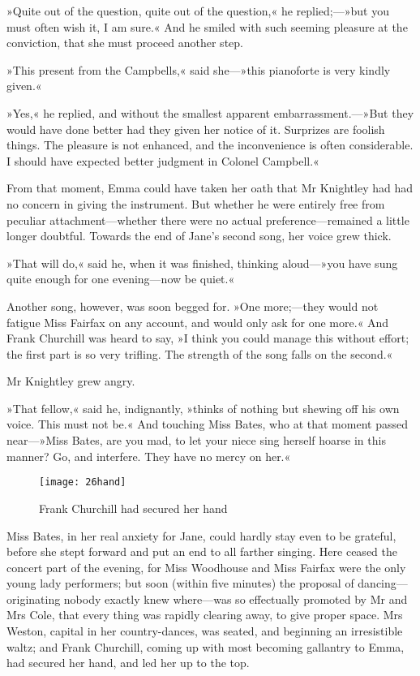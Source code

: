 »Quite out of the question, quite out of the question,« he replied;—»but you must often wish it, I am sure.« And he smiled with such seeming pleasure at the conviction, that she must proceed another step.

»This present from the Campbells,« said she—»this pianoforte is very kindly given.«

»Yes,« he replied, and without the smallest apparent embarrassment.—»But they would have done better had they given her notice of it. Surprizes are foolish things. The pleasure is not enhanced, and the inconvenience is often considerable. I should have expected better judgment in Colonel Campbell.«

From that moment, Emma could have taken her oath that Mr Knightley had had no concern in giving the instrument. But whether he were entirely free from peculiar attachment—whether there were no actual preference—remained a little longer doubtful. Towards the end of Jane's second song, her voice grew thick.

»That will do,« said he, when it was finished, thinking aloud—»you have sung quite enough for one evening—now be quiet.«

Another song, however, was soon begged for. »One more;—they would not fatigue Miss Fairfax on any account, and would only ask for one more.« And Frank Churchill was heard to say, »I think you could manage this without effort; the first part is so very trifling. The strength of the song falls on the second.«

Mr Knightley grew angry.

»That fellow,« said he, indignantly, »thinks of nothing but shewing off his own voice. This must not be.« And touching Miss Bates, who at that moment passed near—»Miss Bates, are you mad, to let your niece sing herself hoarse in this manner? Go, and interfere. They have no mercy on her.«

\begin{figure}[tbph]
\centering
\texttt{[image: 26hand]}
\caption{Frank Churchill had secured her hand}
\end{figure}

Miss Bates, in her real anxiety for Jane, could hardly stay even to be grateful, before she stept forward and put an end to all farther singing. Here ceased the concert part of the evening, for Miss Woodhouse and Miss Fairfax were the only young lady performers; but soon (within five minutes) the proposal of dancing—originating nobody exactly knew where—was so effectually promoted by Mr and Mrs Cole, that every thing was rapidly clearing away, to give proper space. Mrs Weston, capital in her country-dances, was seated, and beginning an irresistible waltz; and Frank Churchill, coming up with most becoming gallantry to Emma, had secured her hand, and led her up to the top.


